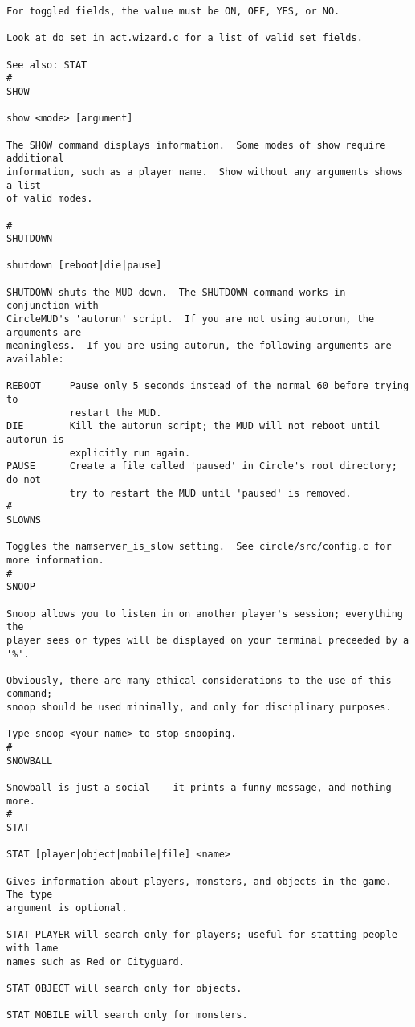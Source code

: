 \documentclass[11pt]{article}
\begin{document}
\begin{verbatim}
For toggled fields, the value must be ON, OFF, YES, or NO.

Look at do_set in act.wizard.c for a list of valid set fields.

See also: STAT
#
SHOW

show <mode> [argument]

The SHOW command displays information.  Some modes of show require additional
information, such as a player name.  Show without any arguments shows a list
of valid modes.

#
SHUTDOWN

shutdown [reboot|die|pause]

SHUTDOWN shuts the MUD down.  The SHUTDOWN command works in conjunction with
CircleMUD's 'autorun' script.  If you are not using autorun, the arguments are
meaningless.  If you are using autorun, the following arguments are available:

REBOOT     Pause only 5 seconds instead of the normal 60 before trying to
           restart the MUD.
DIE        Kill the autorun script; the MUD will not reboot until autorun is
           explicitly run again.
PAUSE      Create a file called 'paused' in Circle's root directory; do not
           try to restart the MUD until 'paused' is removed.
#
SLOWNS

Toggles the namserver_is_slow setting.  See circle/src/config.c for
more information.
#
SNOOP

Snoop allows you to listen in on another player's session; everything the
player sees or types will be displayed on your terminal preceeded by a '%'.

Obviously, there are many ethical considerations to the use of this command; 
snoop should be used minimally, and only for disciplinary purposes.

Type snoop <your name> to stop snooping.
#
SNOWBALL

Snowball is just a social -- it prints a funny message, and nothing more.
#
STAT

STAT [player|object|mobile|file] <name>

Gives information about players, monsters, and objects in the game.  The type
argument is optional.

STAT PLAYER will search only for players; useful for statting people with lame
names such as Red or Cityguard.

STAT OBJECT will search only for objects.

STAT MOBILE will search only for monsters.


\end{verbatim}
\end{document}
